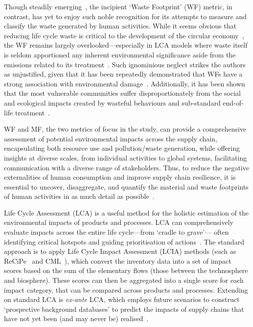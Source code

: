 \documentclass[a4paper,fleqn]{cas-dc}
\begin{document}
Though steadily emerging~\citep{laurenti2016wastefootprint,demirer2019wastefootprint,guillotreau2023wastefootprint}, the incipient `Waste Footprint' (WF) metric, in contrast, has yet to enjoy such noble recognition for its attempts to measure and classify the waste generated by human activities. While it seems obvious that reducing life cycle waste is critical to the development of the circular economy~\citep{towa2020wastefootprint,ellenmacarthur2015ce}, the WF remains largely overlooked---especially in LCA models where waste itself is seldom apportioned any inherent environmental significance aside from the emissions related to its treatment~\citep{laurenti2023wastefootprint}.
Such ignominious neglect strikes the authors as unjustified, given that it has been repeatedly demonstrated that WFs have a strong association with environmental damage~\citep{laurenti2023wastefootprint,doka2024publications, ridoutt2010wasteimpacts,jaio2013wasteabsorbtionfootprint}. Additionally, it has been shown that the most vulnerable communities suffer disproportionately from the social and ecological impacts created by wasteful behaviours and sub-standard end-of-life treatment~\citep{pellow2023envjusticewaste,akese2018envjustice}.

WF and MF, the two metrics of focus in the study, can provide a comprehensive assessment of potential environmental impacts across the supply chain, encapsulating both resource use and pollution/waste generation, while offering insights at diverse scales, from individual activities to global systems, facilitating communication with a diverse range of stakeholders. Thus, to reduce the negative externalities of human consumption and improve supply chain resilience, it is essential to uncover, disaggregate, and quantify the material and waste footprints of human activities in as much detail as possible~\citep{bisinella2024wastelca, towa2020wastefootprint,berger2020mineralsinlca,sonderegger2020mineralsinlca}.


Life Cycle Assessment (LCA) is a useful method for the holistic estimation of the environmental impacts of products and processes. LCA can comprehensively evaluate impacts across the entire life cycle---from `cradle to grave'--- often identifying critical hotspots and guiding prioritisation of actions~\citep{guinee2011lca}. The standard approach is to apply Life Cycle Impact Assessment (LCIA) methods (such as ReCiPe~\citep{huijbregts2016recipe} and CML~\citep{guinee2002cml}), which convert the inventory data into a set of impact scores based on the sum of the elementary flows (those between the technosphere and biosphere). These scores can then be aggregated into a single score for each impact category, that can be compared across products and processes. Extending on standard LCA is \textit{ex-ante} LCA, which employs future scenarios to construct `prospective background databases' to predict the impacts of supply chains that have not yet been (and may never be) realised~\citep{cucurachi2018exante,blanco2020exante}.
\end{document}
